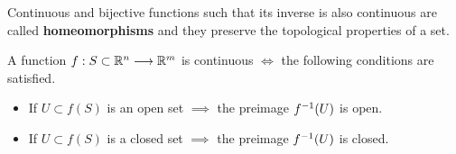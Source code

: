 \begin{note}
    Continuous and bijective functions such that its inverse is also continuous are called \textbf{homeomorphisms} and they
    preserve the topological properties of a set.
\end{note}

\begin{theorem}
    A function $\appl{f}{S\subset\Rtn}{\R^m}$ is continuous $\iff$ the following conditions are satisfied.
        \begin{itemize}[itemsep = -2pt, topsep = -2pt]
            \item If $U\subset f(S)$ is an open set $\implies$ the preimage $f ^{-1}(U)$ is open.
            \item If $U\subset f(S)$ is a closed set $\implies$ the preimage $f ^{-1}(U)$ is closed.        
        \end{itemize}
\end{theorem}

